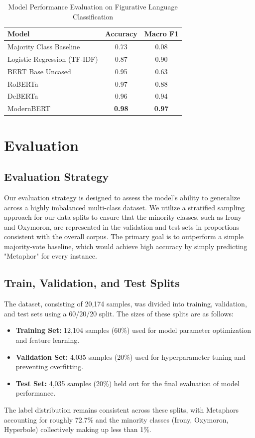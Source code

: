 \documentclass[11pt]{article}
\begin{document}
\begin{table}[htbp]
\centering
\caption{Model Performance Evaluation on Figurative Language Classification}
\label{tab:results}
\begin{tabular}{@{}lcc@{}}
\toprule
\textbf{Model} & \textbf{Accuracy} & \textbf{Macro F1} \\ \midrule
Majority Class Baseline & 0.73 & 0.08 \\
Logistic Regression (TF-IDF) & 0.87 & 0.90 \\
BERT Base Uncased & 0.95 & 0.63 \\
RoBERTa & 0.97 & 0.88 \\
DeBERTa & 0.96 & 0.94 \\
ModernBERT & \textbf{0.98} & \textbf{0.97} \\ \bottomrule
\end{tabular}
\end{table}

\section{Evaluation}

\subsection{Evaluation Strategy}
Our evaluation strategy is designed 
to assess the model's ability to
 generalize across a highly imbalanced multi-class dataset. 
 We utilize a stratified sampling approach for our 
 data splits to ensure that the minority classes, 
 such as Irony and Oxymoron, are represented in the 
 validation and test sets in proportions consistent 
 with the overall corpus. The primary goal is to 
 outperform a simple majority-vote baseline,
  which would achieve high accuracy by simply predicting
   "Metaphor" for every instance.

\subsection{Train, Validation, and Test Splits}
The dataset, consisting of 20,174 samples, was
 divided into training, validation, and test sets using
  a 60/20/20 split. The sizes of these splits are as follows:

\begin{itemize}
\item \textbf{Training Set:} 12,104 samples (60\%) used for model parameter optimization and feature learning.
\item \textbf{Validation Set:} 4,035 samples (20\%) used for hyperparameter tuning and preventing overfitting.
\item \textbf{Test Set:} 4,035 samples (20\%) held out for the final evaluation of model performance.
\end{itemize}
The label distribution remains consistent 
across these splits, with Metaphors accounting 
for roughly 72.7\% and 
the minority classes (Irony, Oxymoron, Hyperbole)
 collectively making up less than 1\%.
\end{document}
